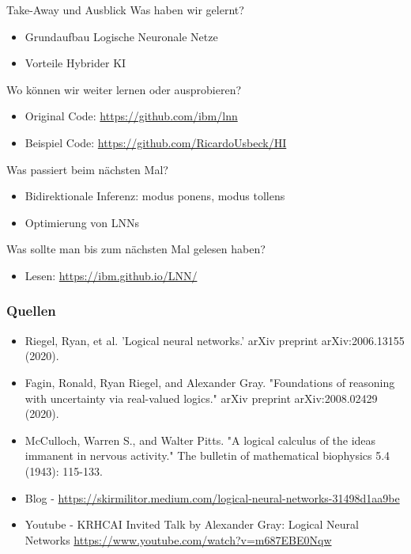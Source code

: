 \documentclass[aspectratio=169]{beamer}
\begin{document}
\begin{frame}{Take-Away und Ausblick} 
Was haben wir gelernt?
\begin{itemize}
    \item Grundaufbau Logische Neuronale Netze
    \item Vorteile Hybrider KI
\end{itemize}
Wo können wir weiter lernen oder ausprobieren?
\begin{itemize}
    \item Original Code: \url{https://github.com/ibm/lnn}
    \item Beispiel Code: \url{https://github.com/RicardoUsbeck/HI}
\end{itemize}
Was passiert beim nächsten Mal?
\begin{itemize}
    \item Bidirektionale Inferenz: modus ponens, modus tollens
    \item Optimierung von LNNs
\end{itemize}
Was sollte man bis zum nächsten Mal gelesen haben?
\begin{itemize}
    \item Lesen: \url{https://ibm.github.io/LNN/}
\end{itemize}
\end{frame}


\begin{frame}\frametitle{Quellen}
\begin{itemize}
    \item Riegel, Ryan, et al. 'Logical neural networks.' arXiv preprint arXiv:2006.13155 (2020).
    \item Fagin, Ronald, Ryan Riegel, and Alexander Gray. "Foundations of reasoning with uncertainty via real-valued logics." arXiv preprint arXiv:2008.02429 (2020).
    \item McCulloch, Warren S., and Walter Pitts. "A logical calculus of the ideas immanent in nervous activity." The bulletin of mathematical biophysics 5.4 (1943): 115-133.
    \item Blog - \url{https://skirmilitor.medium.com/logical-neural-networks-31498d1aa9be}
    \item Youtube - KRHCAI Invited Talk by Alexander Gray: Logical Neural Networks \url{https://www.youtube.com/watch?v=m687EBE0Nqw}
\end{itemize}
\end{frame}
\end{document}
